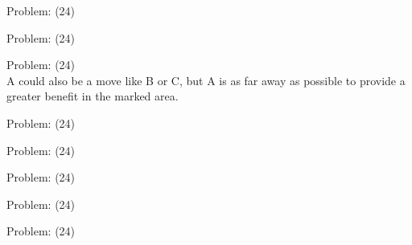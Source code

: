 \documentclass[11pt]{article}
\begin{document}
\begin{minipage}[t]{0.5\textwidth}
  {\centering
  
Problem: (24)\\
  }
\end{minipage}
\begin{minipage}[t]{0.5\textwidth}
  {\centering
  
Problem: (24)\\
  }
\end{minipage}
\begin{minipage}[t]{0.5\textwidth}
  {\centering
  
Problem: (24)\\
A could also be a move like B or C, but A is as far away as possible to provide a greater benefit in the marked area.\\
  }
\end{minipage}
\begin{minipage}[t]{0.5\textwidth}
  {\centering
  
Problem: (24)\\
  }
\end{minipage}
\begin{minipage}[t]{0.5\textwidth}
  {\centering
  
Problem: (24)\\
  }
\end{minipage}
\begin{minipage}[t]{0.5\textwidth}
  {\centering
  
Problem: (24)\\
  }
\end{minipage}
\begin{minipage}[t]{0.5\textwidth}
  {\centering
  
Problem: (24)\\
  }
\end{minipage}
\begin{minipage}[t]{0.5\textwidth}
  {\centering
  
Problem: (24)\\
  }
\end{minipage}
\end{document}
